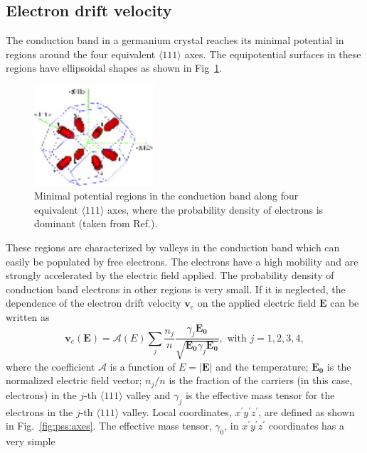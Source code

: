 \subsection{Electron drift velocity} 
\label{sec:pss:elec} 
The conduction band in a germanium crystal reaches its minimal
potential in regions around the four equivalent $\langle 111 \rangle$
axes. The equipotential surfaces in these regions have ellipsoidal
shapes as shown in Fig~\ref{fig:pss:valley}.
\begin{figure} 
\centering 
\includegraphics[width=0.4\textwidth]{valleys}   
\caption{Minimal potential regions in the conduction band along four
equivalent $\langle 111 \rangle$ axes, where the probability density
of electrons is dominant (taken from Ref.\cite{bart}).}
\label{fig:pss:valley} 
\end{figure} 
These regions are characterized by valleys in the conduction band
which can easily be populated by free electrons. The electrons have a
high mobility and are strongly accelerated by the electric field
applied.  The probability density of conduction band electrons in
other regions is very small. If it is neglected, the dependence of the
electron drift velocity $\mathbf{v}_{e}$ on the applied electric field
$\mathbf{E}$ can be written as
\begin{equation} 
\label{eq:pss:ed} 
\mathbf{v}_{e}(\mathbf{E}) = \mathcal{A}(E) \sum_{j} \frac{n_{j}}{n} \frac{\gamma_{j}\mathbf{E_{0}}}{\sqrt{\mathbf{E_{0}}\gamma_{j}\mathbf{E_{0}}}}, \mbox{ with } j=1,2,3,4, 
\end{equation} 
where the coefficient $\mathcal{A}$ is a function of $E=|\mathbf{E}|$
and the temperature; $\mathbf{E_{0}}$ is the normalized electric field
vector; $n_{j}/n$ is the fraction of the carriers (in this case,
electrons) in the $j$-th $\langle 111 \rangle$ valley and $\gamma_{j}$
is the effective mass tensor for the electrons in the $j$-th $\langle
111 \rangle$ valley. Local coordinates,
$x^{\prime}y^{\prime}z^{\prime}$, are defined as shown in
Fig.~\ref{fig:pss:axes}. The effective mass tensor, $\gamma_{0}$, in
$x^{\prime}y^{\prime}z^{\prime}$ coordinates has a very simple

